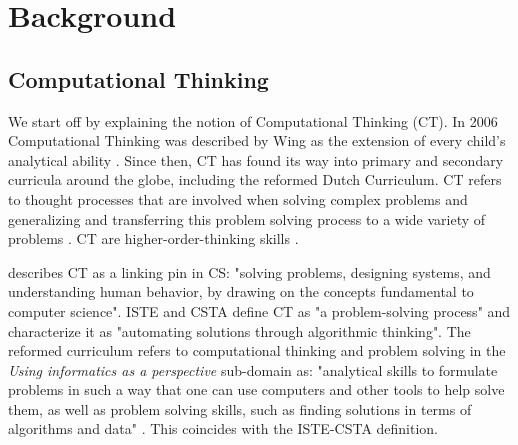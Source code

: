 \section{Background}\label{sec:background}

\subsection{Computational Thinking}\label{sec:CTdef}
We start off by explaining the notion of Computational Thinking (CT). In 2006 Computational Thinking was described by Wing as the extension of every child's analytical ability \cite{Wing2006}. Since then, CT has found its way into primary and secondary curricula around the globe, including the reformed Dutch Curriculum. CT refers to thought processes that are involved when solving complex problems and generalizing and transferring this problem solving process to a wide variety of problems \cite{voogt2015computational}. CT are higher-order-thinking skills \cite{Yadav2017CTteacherEd}.


 describes CT as a linking pin in CS: "solving problems, designing systems, and understanding human behavior, by drawing on the concepts fundamental to computer science". ISTE and CSTA define CT as "a problem-solving process" \cite{CSTA2011CT} and characterize it as "automating solutions through algorithmic thinking". The reformed curriculum refers to computational thinking and problem solving in the \emph{Using informatics as a perspective} sub-domain as: "analytical skills to formulate problems in such a way that one can use computers and other tools to help solve them, as well as problem solving skills,
such as finding solutions in terms of algorithms and data" \cite{Barendsen2016}. This coincides with the ISTE-CSTA definition.



